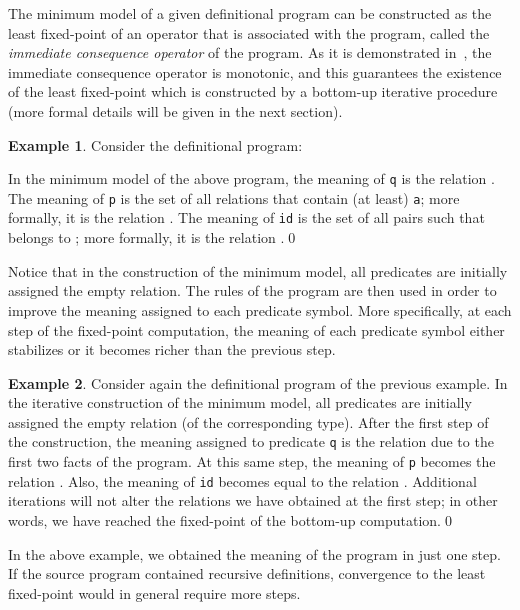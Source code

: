 \documentclass[submission,copyright]{eptcs}
\theoremstyle{definition}
\newtheorem{example}{Example}
\begin{document}
The minimum model of a given definitional program can be constructed as the least fixed-point
of an operator that is associated with the program, called the {\em immediate consequence operator}
of the program. As it is demonstrated in~\cite{Wa91a,KRW05}, the immediate consequence operator
is monotonic, and this guarantees the existence of the least fixed-point which is constructed
by a bottom-up iterative procedure (more formal details will be given in the next section).
\begin{example}\label{example3}
Consider the definitional program:

In the minimum model of the above program, the meaning of {\tt q} is the relation .
The meaning of {\tt p} is the set of all relations that contain (at least) {\tt a}; more formally,
it is the relation . The meaning of {\tt id} is the set of all pairs 
such that  belongs to ; more formally, it is the relation .\qed
\end{example}
Notice that in the construction of the minimum model, all predicates are initially assigned the
empty relation. The rules of the program are then used in order to improve the meaning assigned to
each predicate symbol. More specifically, at each step of the fixed-point computation, the meaning
of each predicate symbol either stabilizes or it becomes richer than the previous step.
\begin{example}\label{example4}
Consider again the definitional program of the previous example. In the iterative construction
of the minimum model, all predicates are initially assigned the empty relation (of the corresponding
type). After the first step of the construction, the meaning assigned to predicate {\tt q} is
the relation  due to the first two facts of the program. At this same step,
the meaning of {\tt p} becomes the relation . Also, the meaning of
{\tt id} becomes equal to the relation . Additional iterations will not
alter the relations we have obtained at the first step; in other words, we have reached the
fixed-point of the bottom-up computation.\qed
\end{example}
In the above example, we obtained the meaning of the program in just one step. If the source
program contained recursive definitions, convergence to the least fixed-point would in general
require more steps.
\end{document}
